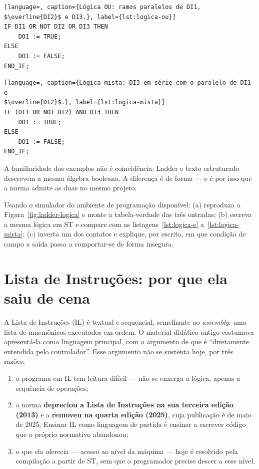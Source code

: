 \begin{lstlisting}[language=, caption={Lógica OU: ramos paralelos de DI1, $\overline{DI2}$ e DI3.}, label={lst:logica-ou}]
IF DI1 OR NOT DI2 OR DI3 THEN
    DO1 := TRUE;
ELSE
    DO1 := FALSE;
END_IF;
\end{lstlisting}

\begin{lstlisting}[language=, caption={Lógica mista: DI3 em série com o paralelo de DI1 e
$\overline{DI2}$.}, label={lst:logica-mista}]
IF (DI1 OR NOT DI2) AND DI3 THEN
    DO1 := TRUE;
ELSE
    DO1 := FALSE;
END_IF;
\end{lstlisting}

A familiaridade dos exemplos não é coincidência: Ladder e texto estruturado descrevem a mesma
álgebra booleana. A diferença é de forma --- e é por isso que a norma admite as duas no mesmo
projeto.

\begin{pratica}
Usando o simulador do ambiente de programação disponível:
(a) reproduza a Figura~\ref{fig:ladder-logica} e monte a tabela-verdade das três entradas;
(b) escreva a mesma lógica em ST e compare com as listagens~\ref{lst:logica-e}
a~\ref{lst:logica-mista};
(c) inverta um dos contatos e explique, por escrito, em que condição de campo a saída passa a
comportar-se de forma insegura.
\end{pratica}

\section{Lista de Instruções: por que ela saiu de cena}
\label{sec:il-depreciada}

A Lista de Instruções (IL) é textual e sequencial, semelhante ao \emph{assembly}: uma lista de
mnemônicos executados em ordem. O material didático antigo costumava apresentá-la como linguagem
principal, com o argumento de que é ``diretamente entendida pelo controlador''. Esse argumento não
se sustenta hoje, por três razões:

\begin{enumerate}
  \item o programa em IL tem leitura difícil --- não se enxerga a lógica, apenas a sequência de
        operações;
  \item a norma \textbf{depreciou a Lista de Instruções na sua terceira edição (2013)} e a
        \textbf{removeu na quarta edição (2025)}, cuja publicação é de maio de 2025. Ensinar IL como
        linguagem de partida é ensinar a escrever código que o próprio normativo abandonou;
  \item o que ela oferecia --- acesso ao nível da máquina --- hoje é resolvido pela compilação a
        partir de ST, sem que o programador precise descer a esse nível.
\end{enumerate}

